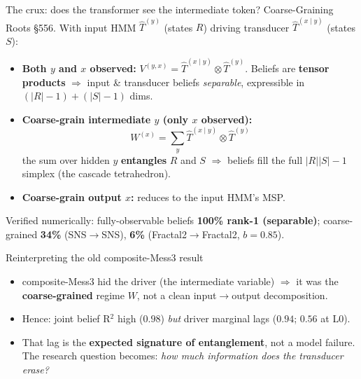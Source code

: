 \documentclass[aspectratio=169]{beamer}
\newcommand{\Tin}{\hat{T}^{(y)}}
\newcommand{\Ttr}{\hat{T}^{(x\mid y)}}
\begin{document}
\begin{frame}{The crux: does the transformer see the intermediate token?}
Coarse-Graining Roots §556. With input HMM $\Tin$ (states $R$) driving transducer $\Ttr$ (states $S$):
\begin{itemize}
  \item \textbf{Both $y$ and $x$ observed:} $V^{(y,x)} = \Ttr \otimes \Tin$. Beliefs are
        \textbf{tensor products} $\Rightarrow$ input \& transducer beliefs \emph{separable},
        expressible in $(|R|{-}1)+(|S|{-}1)$ dims.
  \item \textbf{Coarse-grain intermediate $y$ (only $x$ observed):}
        \[ W^{(x)} = \textstyle\sum_y \Ttr \otimes \Tin \]
        the sum over hidden $y$ \textbf{entangles} $R$ and $S$ $\Rightarrow$ beliefs fill the full
        $|R||S|{-}1$ simplex (the cascade tetrahedron).
  \item \textbf{Coarse-grain output $x$:} reduces to the input HMM's MSP.
\end{itemize}
\vspace{1mm}
\centering
Verified numerically: fully-observable beliefs \textbf{100\% rank-1 (separable)};
coarse-grained \textbf{34\%} (SNS$\to$SNS), \textbf{6\%} (Fractal2$\to$Fractal2, $b{=}0.85$).
\end{frame}

\begin{frame}{Reinterpreting the old composite-Mess3 result}
\begin{itemize}
  \item composite-Mess3 hid the driver (the intermediate variable) $\Rightarrow$ it was the
        \textbf{coarse-grained} regime $W$, not a clean input$\to$output decomposition.
  \item Hence: joint belief R$^2$ high ($0.98$) \emph{but} driver marginal lags ($0.94$; $0.56$ at L0).
  \item That lag is the \textbf{expected signature of entanglement}, not a model failure. The
        research question becomes: \emph{how much information does the transducer erase?}
\end{itemize}
\end{frame}
\end{document}
